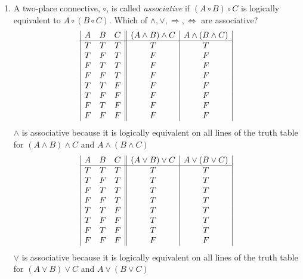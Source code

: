 \documentclass[]{article}
\begin{document}
\begin{enumerate}
    
    \item A two-place connective, $\circ$, is called \emph{associative} if $(A \circ B)\circ C$ is logically equivalent to $A \circ (B \circ C)$. Which of $\land, \lor, \Rightarrow, \iff$ are associative?
    \newline
    \begin{displaymath}
    \begin{array}{|c c c||c|c|}
    A & B & C & (A \land B)\land C & A \land (B \land C)\\
    \hline
    T & T & T & T & T\\
    T & F & T & F & F\\
    F & T & T & F & F\\
    F & F & T & F & F\\
    T & T & F & F & F\\
    T & F & F & F & F\\
    F & T & F & F & F\\
    F & F & F & F & F\\
    \end{array}
    \end{displaymath}
    \newline $\land$ is associative because it is logically equivalent on all lines of the truth table for $(A \land B)\land C$ and $A \land (B \land C)$
    \newline
    \begin{displaymath}
    \begin{array}{|c c c||c|c|}
    A & B & C & (A \lor B)\lor C & A \lor (B \lor C)\\
    \hline
    T & T & T & T & T\\
    T & F & T & T & T\\
    F & T & T & T & T\\
    F & F & T & T & T\\
    T & T & F & T & T\\
    T & F & F & T & T\\
    F & T & F & T & T\\
    F & F & F & F & F\\
    \end{array}
    \end{displaymath}
    \newline $\lor$ is associative because it is logically equivalent on all lines of the truth table for $(A \lor B)\lor C$ and $A \lor (B \lor C)$
    \newline
    \begin{displaymath}

\end{displaymath}
\end{enumerate}
\end{document}
